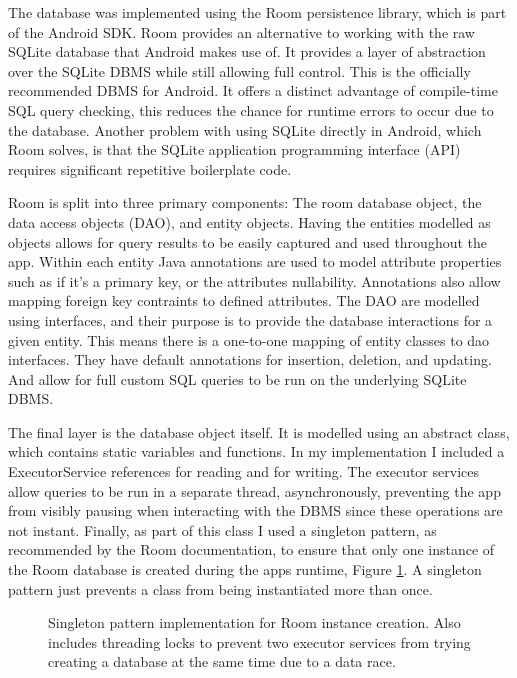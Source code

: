 \documentclass{l4proj}
\begin{document}
The database was implemented using the Room persistence library, which is part of the Android SDK. Room provides an alternative to working with the raw SQLite database that Android makes use of. It provides a layer of abstraction over the SQLite DBMS while still allowing full control. This is the officially recommended DBMS for Android. It offers a distinct advantage of compile-time SQL query checking, this reduces the chance for runtime errors to occur due to the database. Another problem with using SQLite directly in Android, which Room solves, is that the SQLite application programming interface (API) requires significant repetitive boilerplate code.

Room is split into three primary components: The room database object, the data access objects (DAO), and entity objects. Having the entities modelled as objects allows for query results to be easily captured and used throughout the app. Within each entity Java annotations are used to model attribute properties such as if it's a primary key, or the attributes nullability. Annotations also allow mapping foreign key contraints to defined attributes. The DAO are modelled using interfaces, and their purpose is to provide the database interactions for a given entity. This means there is a one-to-one mapping of entity classes to dao interfaces. They have default annotations for insertion, deletion, and updating. And allow for full custom SQL queries to be run on the underlying SQLite DBMS.

The final layer is the database object itself. It is modelled using an abstract class, which contains static variables and functions. In my implementation I included a ExecutorService references for reading and for writing. The executor services allow queries to be run in a separate thread, asynchronously, preventing the app from visibly pausing when interacting with the DBMS since these operations are not instant. Finally, as part of this class I used a singleton pattern, as recommended by the Room documentation, to ensure that only one instance of the Room database is created during the apps runtime, Figure \ref{cde:singleton}. A singleton pattern just prevents a class from being instantiated more than once.

\begin{figure}[!htb]
    
    \caption{ Singleton pattern implementation for Room instance creation. Also includes threading locks to prevent two executor services from trying creating a database at the same time due to a data race. }
    \label{cde:singleton}
\end{figure}
\end{document}
